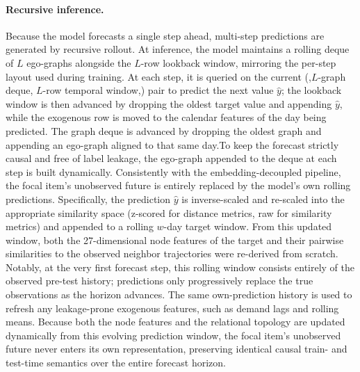 \paragraph{Recursive inference.}
Because the model forecasts a single step ahead, multi-step predictions are generated by recursive rollout. At inference, the model maintains a rolling deque of $L$ ego-graphs alongside the $L$-row lookback window, mirroring the per-step layout used during training. At each step, it is queried on the current (,$L$-graph deque, $L$-row temporal window,) pair to predict the next value $\hat{y}$; the lookback window is then advanced by dropping the oldest target value and appending $\hat{y}$, while the exogenous row is moved to the calendar features of the day being predicted. The graph deque is advanced by dropping the oldest graph and appending an ego-graph aligned to that same day.To keep the forecast strictly causal and free of label leakage, the ego-graph appended to the deque at each step is built dynamically. Consistently with the embedding-decoupled pipeline, the focal item's unobserved future is entirely replaced by the model's own rolling predictions. Specifically, the prediction $\hat{y}$ is inverse-scaled and re-scaled into the appropriate similarity space (z-scored for distance metrics, raw for similarity metrics) and appended to a rolling $w$-day target window. From this updated window, both the 27-dimensional node features of the target and their pairwise similarities to the observed neighbor trajectories were re-derived from scratch. Notably, at the very first forecast step, this rolling window consists entirely of the observed pre-test history; predictions only progressively replace the true observations as the horizon advances. The same own-prediction history is used to refresh any leakage-prone exogenous features, such as demand lags and rolling means. Because both the node features and the relational topology are updated dynamically from this evolving prediction window, the focal item's unobserved future never enters its own representation, preserving identical causal train- and test-time semantics over the entire forecast horizon.

